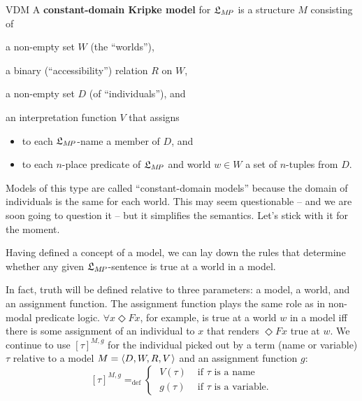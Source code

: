 \begin{definition}{}{VDM}
  A \textbf{constant-domain Kripke model} for $\mathfrak{L}_{M\!P}$ is a structure $M$
  consisting of%
  \medskip
  \begin{compactenum}
    \item a non-empty set $W$ (the ``worlds''),
    \item a binary (``accessibility'') relation $R$ on $W$,
    \item a non-empty set $D$ (of ``individuals''), and
    \item an interpretation function $V$ that assigns%
    \vspace{-1mm}
    \begin{itemize}
      \itemsep-1mm
      \item to each $\mathfrak{L}_{M\!P}$-name a member of $D$, and
      \item to each $n$-place predicate of $\mathfrak{L}_{M\!P}$ and world $w \in W$ a set of
            $n$-tuples from $D$.
    \end{itemize}
  \end{compactenum}
\end{definition}

Models of this type are called ``constant-domain models'' because the domain of
individuals is the same for each world. This may seem questionable -- and we are
soon going to question it -- but it simplifies the semantics. Let’s stick
with it for the moment.

Having defined a concept of a model, we can lay down the rules that determine
whether any given $\mathfrak{L}_{M\!P}$-sentence is true at a world in a model.

In fact, truth will be defined relative to three parameters: a model, a world,
and an assignment function. The assignment function plays the same role as in
non-modal predicate logic. $\forall x \Diamond Fx$, for example, is true at a
world $w$ in a model iff there is some assignment of an individual to $x$ that
renders $\Diamond Fx$ true at $w$. We continue to use $[\tau]^{M,g}$ for the
individual picked out by a term (name or variable) $\tau$ relative to a model
$M = \t{D,W,R,V}$ and an assignment function $g$:
\[
  [\tau]^{M,g} =_\text{def} \begin{cases} \;V(\tau) & \text{ if $\tau$ is a name}\\
    \;g(\tau) & \text{ if $\tau$ is a variable}.
  \end{cases}
\]

